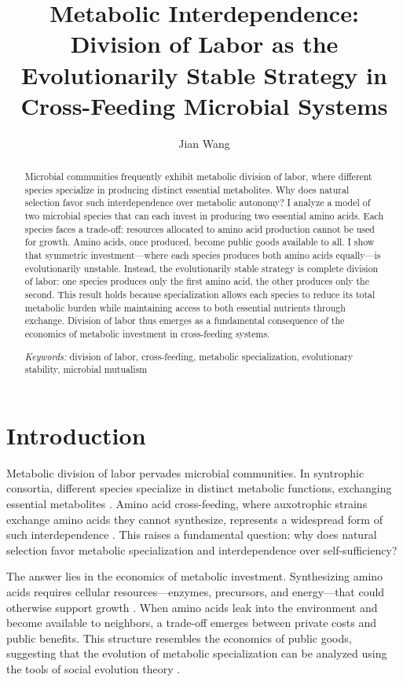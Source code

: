 \documentclass[11pt]{article}
\title{Metabolic Interdependence: Division of Labor as the Evolutionarily Stable Strategy in Cross-Feeding Microbial Systems}
\author{Jian Wang}
\date{}
\begin{document}
\maketitle

\begin{abstract}
Microbial communities frequently exhibit metabolic division of labor, where different species specialize in producing distinct essential metabolites. Why does natural selection favor such interdependence over metabolic autonomy? I analyze a model of two microbial species that can each invest in producing two essential amino acids. Each species faces a trade-off: resources allocated to amino acid production cannot be used for growth. Amino acids, once produced, become public goods available to all. I show that symmetric investment---where each species produces both amino acids equally---is evolutionarily unstable. Instead, the evolutionarily stable strategy is complete division of labor: one species produces only the first amino acid, the other produces only the second. This result holds because specialization allows each species to reduce its total metabolic burden while maintaining access to both essential nutrients through exchange. Division of labor thus emerges as a fundamental consequence of the economics of metabolic investment in cross-feeding systems.

\bigskip
\noindent\textit{Keywords:} division of labor, cross-feeding, metabolic specialization, evolutionary stability, microbial mutualism
\end{abstract}

\section{Introduction}

Metabolic division of labor pervades microbial communities. In syntrophic consortia, different species specialize in distinct metabolic functions, exchanging essential metabolites \citep{morris2013black}. Amino acid cross-feeding, where auxotrophic strains exchange amino acids they cannot synthesize, represents a widespread form of such interdependence \citep{mee2014syntrophic}. This raises a fundamental question: why does natural selection favor metabolic specialization and interdependence over self-sufficiency?

The answer lies in the economics of metabolic investment. Synthesizing amino acids requires cellular resources---enzymes, precursors, and energy---that could otherwise support growth \citep{lynch2015evolutionary}. When amino acids leak into the environment and become available to neighbors, a trade-off emerges between private costs and public benefits. This structure resembles the economics of public goods, suggesting that the evolution of metabolic specialization can be analyzed using the tools of social evolution theory \citep{frank1998foundations}.
\end{document}

